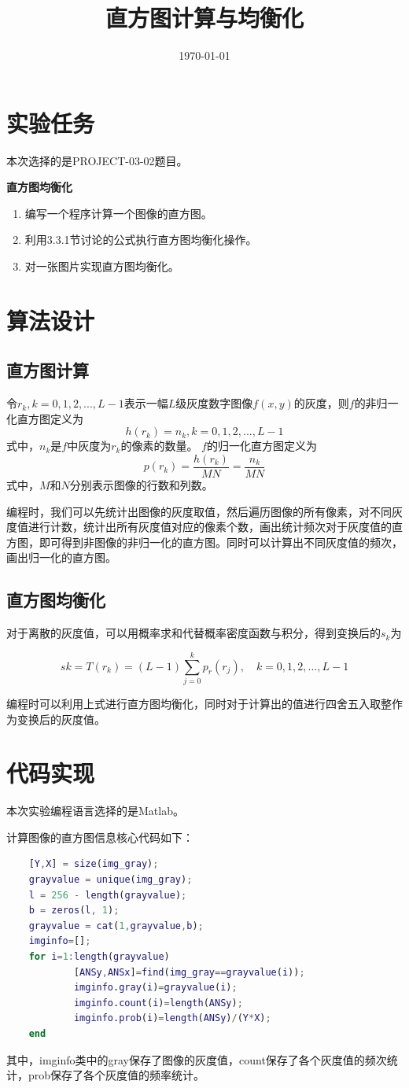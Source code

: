 \documentclass{../source/Experiment}
\title{直方图计算与均衡化}
\date{\today}
\begin{document}
\makecover
\section{实验任务}
本次选择的是PROJECT-03-02题目。

\bfseries{直方图均衡化}

\begin{enumerate}
    \item 编写一个程序计算一个图像的直方图。
    \item 利用3.3.1节讨论的公式执行直方图均衡化操作。
    \item 对一张图片实现直方图均衡化。
\end{enumerate}
\section{算法设计}
\subsection{直方图计算}
令$r_k, k = 0,1,2,...,L-1 $表示一幅$L$级灰度数字图像$f(x,y)$的灰度，则$f$的非归一化直方图定义为
$$h(r_k) = n_k, k = 0,1,2,...,L-1$$
式中，$n_k$是$f$中灰度为$r_k$的像素的数量。
$f$的归一化直方图定义为
$$p(r_k) = \frac{h(r_k)}{MN} = \frac{n_k}{MN}$$
式中，$M$和$N$分别表示图像的行数和列数。

编程时，我们可以先统计出图像的灰度取值，然后遍历图像的所有像素，对不同灰度值进行计数，统计出所有灰度值对应的像素个数，画出统计频次对于灰度值的直方图，即可得到非图像的非归一化的直方图。同时可以计算出不同灰度值的频次，画出归一化的直方图。
\subsection{直方图均衡化}
对于离散的灰度值，可以用概率求和代替概率密度函数与积分，得到变换后的$s_k$为

$$sk = T(r_k) = (L - 1)\sum^k_{j = 0}p_r(r_j), \quad k = 0,1,2,...,L-1$$

编程时可以利用上式进行直方图均衡化，同时对于计算出的值进行四舍五入取整作为变换后的灰度值。
\section{代码实现}
本次实验编程语言选择的是Matlab。

计算图像的直方图信息核心代码如下：

\begin{lstlisting}[language = matlab]
    % 获取灰度直方图的信息（r，数量，概率）
    [Y,X] = size(img_gray);
    grayvalue = unique(img_gray);
    l = 256 - length(grayvalue);
    b = zeros(l, 1);
    grayvalue = cat(1,grayvalue,b);
    imginfo=[];
    for i=1:length(grayvalue)
            [ANSy,ANSx]=find(img_gray==grayvalue(i));
            imginfo.gray(i)=grayvalue(i);
            imginfo.count(i)=length(ANSy);
            imginfo.prob(i)=length(ANSy)/(Y*X);
    end 
        \end{lstlisting}
其中，imginfo类中的gray保存了图像的灰度值，count保存了各个灰度值的频次统计，prob保存了各个灰度值的频率统计。
\end{document}
